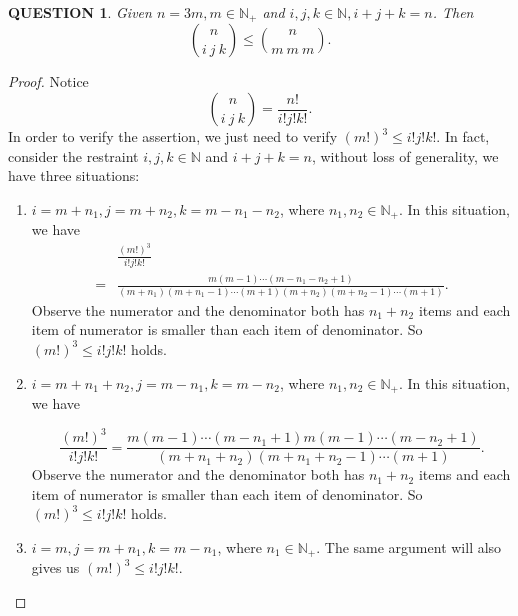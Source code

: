 \documentclass[12pt]{article}
\renewcommand{\(}{\left(}%
\renewcommand{\)}{\right)}%
\renewcommand{\[}{\left[}%
\renewcommand{\]}{\right]}%
\newcommand{\n}{\mathbb{N}}
\newtheorem{question}{QUESTION}[section]}
\newtheorem{proof}{Proof.}}
\begin{document}
  \begin{question}
  	Given $n=3m,m\in\n_+$ and $i,j,k\in\n,i+j+k=n$. Then 
  	\begin{equation*}
  		\binom{n}{i\ j\ k}\leq \binom{n}{m\ m\ m}.
  	\end{equation*}
  \end{question}
  \begin{proof}
  	Notice
  	\begin{equation*}
  		\binom{n}{i\ j\ k}=\frac{n!}{i!j!k!}.
  	\end{equation*}
  	In order to verify the assertion, we just need to verify $(m!)^3\leq i!j!k!$. In fact, consider the restraint $i,j,k\in\n$ and $i+j+k=n$, without loss of generality, we have three situations:
  	\begin{enumerate}
  		\item $i=m+n_1,j=m+n_2,k=m-n_1-n_2$, where $n_1,n_2\in\n_+$. In this situation, we have
  			\begin{equation*}
  				\begin{split}
  					&\frac{(m!)^3}{i!j!k!} \\
  					=&\frac{ m(m-1)\cdots(m-n_1-n_2+1)}{(m+n_1)(m+n_1-1)\cdots(m+1)(m+n_2)(m+n_2-1)\cdots(m+1)}.
  				\end{split}
  	    	\end{equation*}
  	    	Observe the numerator and the denominator both has $n_1+n_2$ items and each item of numerator is smaller than each item of denominator. So $(m!)^3\leq i!j!k!$ holds.
  		\item $i=m+n_1+n_2,j=m-n_1,k=m-n_2$, where $n_1,n_2\in\n_+$. In this situation, we have

  		\begin{equation*}
  			\frac{(m!)^3}{i!j!k!}=\frac{ m(m-1)\cdots(m-n_1+1)m(m-1)\cdots(m-n_2+1)}{(m+n_1+n_2)(m+n_1+n_2-1)\cdots(m+1)}.
  		\end{equation*}
  		Observe the numerator and the denominator both has $n_1+n_2$ items and each item of numerator is smaller than each item of denominator. So $(m!)^3\leq i!j!k!$ holds.
  		\item $i=m,j=m+n_1,k=m-n_1$, where $n_1\in\n_+$. The same argument will also gives us $(m!)^3\leq i!j!k!$.
  	\end{enumerate}
  \end{proof}
  
\end{document}
